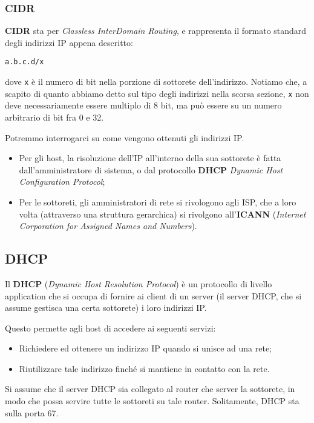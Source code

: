 \documentclass[a4paper,11pt]{article}
\begin{document}
\subsubsection{CIDR}
\textbf{CIDR} sta per \textit{Classless InterDomain Routing}, e rappresenta il formato standard degli indirizzi IP appena descritto:
\begin{lstlisting}[style=codestyle]	
a.b.c.d/x
\end{lstlisting}
dove \lstinline|x| è il numero di bit nella porzione di sottorete dell'indirizzo.
Notiamo che, a scapito di quanto abbiamo detto sul tipo degli indirizzi nella scorsa sezione, \lstinline|x| non deve necessariamente essere multiplo di 8 bit, ma può essere su un numero arbitrario di bit fra 0 e 32. 

Potremmo interrogarci su come vengono ottenuti gli indirizzi IP.
\begin{itemize}
	\item Per gli host, la risoluzione dell'IP all'interno della sua sottorete è fatta dall'amministratore di sistema, o dal protocollo \textbf{DHCP} \textit{Dynamic Host Configuration Protocol};
	\item Per le sottoreti, gli amministratori di rete si rivologono agli ISP, che a loro volta (attraverso una struttura gerarchica) si rivolgono all'\textbf{ICANN} (\textit{Internet Corporation for Assigned Names and Numbers}).
\end{itemize}

\subsection{DHCP}
Il \textbf{DHCP} (\textit{Dynamic Host Resolution Protocol}) è un protocollo di livello application che si occupa di fornire ai client di un server (il server DHCP, che si assume gestisca una certa sottorete) i loro indirizzi IP.

Questo permette agli host di accedere ai seguenti servizi:
\begin{itemize}
	\item Richiedere ed ottenere un indirizzo IP quando si unisce ad una rete;
	\item Riutilizzare tale indirizzo finché si mantiene in contatto con la rete.
\end{itemize}

Si assume che il server DHCP sia collegato al router che server la sottorete, in modo che possa servire tutte le sottoreti su tale router. Solitamente, DHCP sta sulla porta 67.
\end{document}
